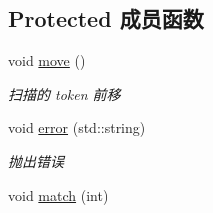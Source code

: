 \subsection*{Protected 成员函数}
\begin{DoxyCompactItemize}
\item 
void \hyperlink{class_parser_ae6cc5bf3ee250c954a36bd16f7559d79}{move} ()\hypertarget{class_parser_ae6cc5bf3ee250c954a36bd16f7559d79}{}\label{class_parser_ae6cc5bf3ee250c954a36bd16f7559d79}

\begin{DoxyCompactList}\small\item\em 扫描的 token 前移 \end{DoxyCompactList}\item 
void \hyperlink{class_parser_a0915f6c61a1a70038a8608ff7a823b5a}{error} (std\+::string)\hypertarget{class_parser_a0915f6c61a1a70038a8608ff7a823b5a}{}\label{class_parser_a0915f6c61a1a70038a8608ff7a823b5a}

\begin{DoxyCompactList}\small\item\em 抛出错误 \end{DoxyCompactList}\item 
void \hyperlink{class_parser_a009517efe4fe90b136071179beb32360}{match} (int)\hypertarget{class_parser_a009517efe4fe90b136071179beb32360}{}\label{class_parser_a009517efe4fe90b136071179beb32360}


\end{DoxyCompactItemize}
